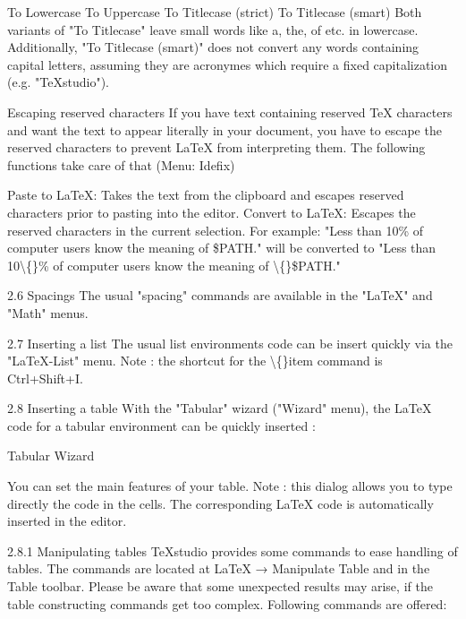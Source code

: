 \documentclass{article}
\begin{document}
	To Lowercase
	To Uppercase
	To Titlecase (strict)
	To Titlecase (smart)
	Both variants of "To Titlecase" leave small words like a, the, of etc. in lowercase. Additionally, "To Titlecase (smart)" does not convert any words containing capital letters, assuming they are acronymes which require a fixed capitalization (e.g. "TeXstudio").
	
	Escaping reserved characters
	If you have text containing reserved TeX characters and want the text to appear literally in your document, you have to escape the reserved characters to prevent LaTeX from interpreting them. The following functions take care of that (Menu: Idefix)
	
	Paste to LaTeX: Takes the text from the clipboard and escapes reserved characters prior to pasting into the editor.
	Convert to LaTeX: Escapes the reserved characters in the current selection.
	For example: "Less than 10\% of computer users know the meaning of \$PATH." will be converted to "Less than 10\textbackslash\{\}\% of computer users know the meaning of \textbackslash\{\}\$PATH."
	
	2.6 Spacings
	The usual "spacing" commands are available in the "LaTeX" and "Math" menus.
	
	2.7 Inserting a list
	The usual list environments code can be insert quickly via the "LaTeX-List" menu.
	Note : the shortcut for the \textbackslash\{\}item command is Ctrl+Shift+I.
	
	2.8 Inserting a table
	With the "Tabular" wizard ("Wizard" menu), the LaTeX code for a tabular environment can be quickly inserted :
	
	Tabular Wizard
	
	You can set the main features of your table.
	Note : this dialog allows you to type directly the code in the cells.
	The corresponding LaTeX code is automatically inserted in the editor.
	
	2.8.1 Manipulating tables
	TeXstudio provides some commands to ease handling of tables. The commands are located at LaTeX → Manipulate Table and in the Table toolbar. Please be aware that some unexpected results may arise, if the table constructing commands get too complex. Following commands are offered:
	
\end{document}
